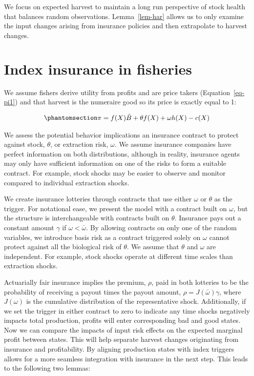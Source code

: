 \documentclass[
  letterpaper,
  DIV=11,
  numbers=noendperiod]{scrartcl}
\theoremstyle{plain}
\theoremstyle{plain}
\theoremstyle{remark}
\begin{document}
We focus on expected harvest to maintain a long run perspective of stock
health that balances random observations. Lemma~\ref{lem-har} allows us
to only examine the input changes arising from insurance policies and
then extrapolate to harvest changes.

\section{Index insurance in fisheries}\label{sec-common}

We assume fishers derive utility from profits and are price takers
(Equation~\ref{eq-pi1}) and that harvest is the numeraire good so its
price is exactly equal to 1:

\begin{equation}\phantomsection\label{eq-pi1}{
\begin{aligned}
\pi=f(X)\hat{B}+\theta f(X)+\omega h(X)-c(X)
\end{aligned}
}\end{equation}

We assess the potential behavior implications an insurance contract to
protect against stock, \(\theta\), or extraction risk, \(\omega\). We
assume insurance companies have perfect information on both
distributions, although in reality, insurance agents may only have
sufficient information on one of the risks to form a suitable contract.
For example, stock shocks may be easier to observe and monitor compared
to individual extraction shocks.

We create insurance lotteries through contracts that use either
\(\omega\) or \(\theta\) as the trigger. For notational ease, we present
the model with a contract built on \(\omega\), but the structure is
interchangeable with contracts built on \(\theta\). Insurance pays out a
constant amount \(\gamma\) if \(\omega<\bar \omega\). By allowing
contracts on only one of the random variables, we introduce basis risk
as a contract triggered solely on \(\omega\) cannot protect against all
the biological risk of \(\theta\). We assume that \(\theta\) and
\(\omega\) are independent. For example, stock shocks operate at
different time scales than extraction shocks.

Actuarially fair insurance implies the premium, \(\rho\), paid in both
lotteries to be the probability of receiving a payout times the payout
amount, \(\rho=J(\bar \omega)\gamma\), where \(J(\omega)\) is the
cumulative distribution of the representative shock. Additionally, if we
set the trigger in either contract to zero to indicate any time shocks
negatively impacts total production, profits will enter corresponding
bad and good states. Now we can compare the impacts of input risk
effects on the expected marginal profit between states. This will help
separate harvest changes originating from insurance and profitability.
By aligning production states with index triggers allows for a more
seamless integration with insurance in the next step. This leads to the
following two lemmas:
\end{document}
